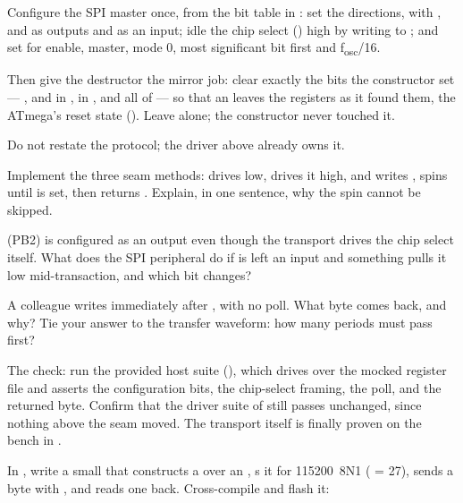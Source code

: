 Configure the SPI master once, from the bit table in : set the
 directions, with ,  and  as outputs and  as an
input; idle the chip select () high by writing to ; and set  for
enable, master, mode 0, most significant bit first and f\textsubscript{osc}/16.

Then give the destructor the mirror job: clear exactly the bits the constructor set ---
,  and  in ,  in , and all of
 --- so that an  leaves the registers as it found them, the ATmega's reset
state (). Leave  alone; the constructor never touched it.

Do not restate the protocol; the driver above already owns it.

 Implement the three seam methods:  drives  low,  drives
it high, and  writes , spins until  is set, then returns
. Explain, in one sentence, why the spin cannot be skipped.

  (PB2) is configured as an output even though the transport drives the chip
select itself. What does the SPI peripheral do if  is left an input and something pulls it
low mid-transaction, and which  bit changes?

 A colleague writes  immediately after , with no poll.
What byte comes back, and why? Tie your answer to the transfer waveform: how many  periods
must pass first?

 The check: run the provided host suite (), which drives  over
the mocked register file and asserts the configuration bits, the chip-select framing, the
 poll, and the returned byte. Confirm that the driver suite of  still passes
unchanged, since nothing above the seam moved. The transport itself is finally proven on the bench
in .

\label{c9:ex:2}

 In , write a small  that constructs a  over an
, s it for 115200~8N1 ( = 27), sends a byte with
, and reads one back. Cross-compile and flash it:

